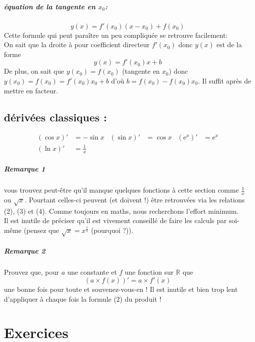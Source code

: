 \documentclass[11pt]{article}
\newcommand{\R}{\mathbb R}
\newcommand{\de}[1]{\left(#1\right)'}
\newcommand{\e}[1]{\mathrm{e}^{#1}}
\begin{document}
        \subparagraph{équation de la tangente en $x_0$:}
        \begin{equation*}
            y(x)=f'(x_0)(x-x_0) +f(x_0) 
        \end{equation*}
        Cette formule qui peut paraître un peu compliquée se retrouve facilement:\\
        On sait que la droite à pour coefficient directeur $f'(x_0)$ donc $y(x)$ est de la forme
        \begin{equation*}
            y(x)=f'(x_0)x+b
        \end{equation*}
        De plus, on sait que $y(x_0)=f(x_0)$ (tangente en $x_0$) donc $y(x_0)=f(x_0)= f'(x_0)x_0 +b$ d'où $b=f(x_0) -f(x_0)x_0$. Il suffit après de mettre en facteur.

        \subsection{dérivées classiques :}
        \begin{align*}
            \de{\cos{x}} &= -\sin{x} &\de{\sin{x}} &= \cos{x} & \de{\e{x}} &= \e{x} \\
            \de{\ln{x}} &= \frac{1}{x} 
        \end{align*}
        \subparagraph{Remarque 1} vous trouvez peut-être qu'il manque quelques fonctions à cette section comme $\frac{1}{x}$ ou $\sqrt{x}$. Pourtant celles-ci peuvent (et doivent !) être retrouvées via les relations (2), (3) et (4). Comme toujours en maths, nous recherchons l'effort minimum.\\
        Il est inutile de préciser qu'il est vivement conseillé de faire les calculs par soi-même (pensez que $\sqrt{x} = x^{\frac{1}{2}}$ (pourquoi ?)).
        \subparagraph{Remarque 2} Prouvez que, pour $a$ une constante et $f$ une fonction sur $\R$ que
        \begin{equation*}
         \de{a\times f(x)} = a\times f'(x)
        \end{equation*}
         une bonne fois pour toute et souvenez-vous-en ! Il est inutile et bien trop lent d'appliquer à chaque fois la formule (2) du produit !  

    \section{Exercices}
\end{document}
